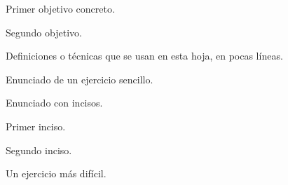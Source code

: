 \documentclass[12pt,a4paper]{article}
\begin{document}
    \encabezado

    \begin{objetivos}
        \item Primer objetivo concreto.
        \item Segundo objetivo.
    \end{objetivos}

    \begin{recordatorio}
        Definiciones o técnicas que se usan en esta hoja, en pocas líneas.
    \end{recordatorio}


    \begin{ejercicio}[1]
        Enunciado de un ejercicio sencillo.
    \end{ejercicio}


    \begin{ejercicio}[2]
        Enunciado con incisos.
        \begin{incisos}
            \item Primer inciso.
            \item Segundo inciso.
        \end{incisos}
    \end{ejercicio}


    \begin{ejercicio}[3]
        Un ejercicio más difícil.
    \end{ejercicio}

    \bitacora
\end{document}
